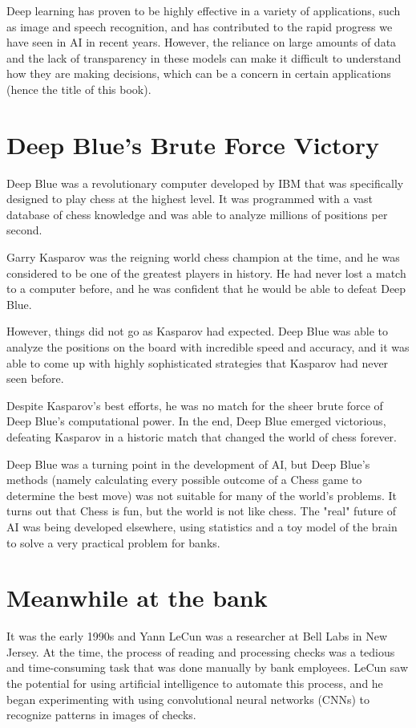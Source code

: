 Deep learning has proven to be highly effective in a variety of applications, such as image and speech recognition, and has contributed to the rapid progress we have seen in AI in recent years. However, the reliance on large amounts of data and the lack of transparency in these models can make it difficult to understand how they are making decisions, which can be a concern in certain applications (hence the title of this book).

\section{Deep Blue's Brute Force Victory}

Deep Blue was a revolutionary computer developed by IBM that was specifically designed to play chess at the highest level. It was programmed with a vast database of chess knowledge and was able to analyze millions of positions per second.

Garry Kasparov was the reigning world chess champion at the time, and he was considered to be one of the greatest players in history. He had never lost a match to a computer before, and he was confident that he would be able to defeat Deep Blue.

However, things did not go as Kasparov had expected. Deep Blue was able to analyze the positions on the board with incredible speed and accuracy, and it was able to come up with highly sophisticated strategies that Kasparov had never seen before.

Despite Kasparov's best efforts, he was no match for the sheer brute force of Deep Blue's computational power. In the end, Deep Blue emerged victorious, defeating Kasparov in a historic match that changed the world of chess forever.

Deep Blue was a turning point in the development of AI, but Deep Blue's methods (namely calculating every possible outcome of a Chess game to determine the best move) was not suitable for many of the world's problems. It turns out that Chess is fun, but the world is not like chess. The "real" future of AI was being developed elsewhere, using statistics and a toy model of the brain to solve a very practical problem for banks.

\section{Meanwhile at the bank}

It was the early 1990s and Yann LeCun was a researcher at Bell Labs in New Jersey. At the time, the process of reading and processing checks was a tedious and time-consuming task that was done manually by bank employees. LeCun saw the potential for using artificial intelligence to automate this process, and he began experimenting with using convolutional neural networks (CNNs) to recognize patterns in images of checks.

